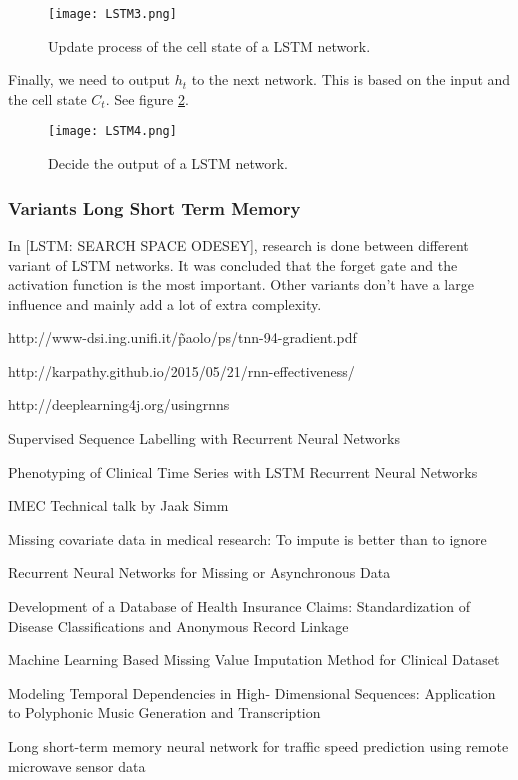 \begin{figure}[H]
	\centering
	\texttt{[image: LSTM3.png]}
	\caption{Update process of the cell state of a LSTM network.}
	\label{fig:LSTM3}
\end{figure} 

Finally, we need to output $h_t$ to the next network. This is based on the input and the cell state $C_t$. See figure \ref{fig:LSTM4}.

\begin{figure}[H]
	\centering
	\texttt{[image: LSTM4.png]}
	\caption{Decide the output of a LSTM network.}
	\label{fig:LSTM4}
\end{figure} 


\subsubsection{Variants Long Short Term Memory}

In [LSTM: SEARCH SPACE ODESEY], research is done between different variant of LSTM networks. It was concluded that the forget gate and the activation function is the most important. Other variants don't have a large influence and mainly add a lot of extra complexity.


http://www-dsi.ing.unifi.it/\~paolo/ps/tnn-94-gradient.pdf


http://karpathy.github.io/2015/05/21/rnn-effectiveness/

http://deeplearning4j.org/usingrnns

Supervised Sequence Labelling with Recurrent Neural
Networks

Phenotyping of Clinical Time Series with LSTM
Recurrent Neural Networks

IMEC Technical talk by Jaak Simm

Missing covariate data in medical research: To impute
is better than to ignore


Recurrent Neural Networks for Missing or
Asynchronous Data

Development of a Database of Health Insurance
Claims: Standardization of Disease Classifications and
Anonymous Record Linkage

Machine Learning Based Missing Value Imputation
Method for Clinical Dataset

Modeling Temporal Dependencies in High-
Dimensional Sequences: Application to Polyphonic
Music Generation and Transcription

Long short-term memory neural network for traffic
speed prediction using remote microwave sensor data


